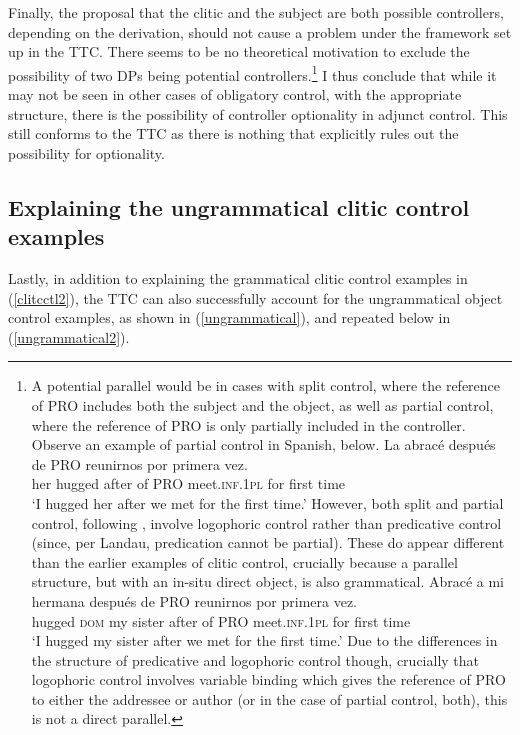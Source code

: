 \documentclass[output=paper,colorlinks,citecolor=brown]{langscibook}
\begin{document}
Finally, the proposal that the clitic and the subject are both possible controllers, depending on the derivation, should not cause a problem under the framework set up in the TTC. There seems to be no theoretical motivation to exclude the possibility of two DPs being potential controllers.\footnote{A potential parallel would be in cases with split control, where the reference of PRO includes both the subject and the object, as well as partial control, where the reference of PRO is only partially included in the controller. Observe an example of partial control in Spanish, below.
\ea
\gll La abracé después de PRO reunirnos por primera vez. \\
her hugged after of PRO meet.\textsc{inf.1pl} for first time \\
\glt ‘I hugged her after we met for the first time.’
\z
However, both split and partial control, following \citet{landau2015}, involve logophoric control rather than predicative control (since, per Landau, predication cannot be partial). These do appear different than the earlier examples of clitic control, crucially because a parallel structure, but with an in-situ direct object, is also grammatical.
\ea
\gll Abracé a mi hermana después de PRO reunirnos por primera vez. \\
hugged \textsc{dom} my sister after of PRO meet.\textsc{inf.1pl} for first time \\
\glt ‘I hugged my sister after we met for the first time.’
\z
Due to the differences in the structure of predicative and logophoric control though, crucially that logophoric control involves variable binding which gives the reference of PRO to either the addressee or author (or in the case of partial control, both), this is not a direct parallel.} I thus conclude that while it may not be seen in other cases of obligatory control, with the appropriate structure, there is the possibility of controller optionality in adjunct control. This still conforms to the TTC as there is nothing that explicitly rules out the possibility for optionality.


\subsection{Explaining the ungrammatical clitic control examples} \label{section4.3}

Lastly, in addition to explaining the grammatical clitic control examples in (\ref{clitcctl2}), the TTC can also successfully account for the ungrammatical object control examples, as shown in (\ref{ungrammatical}), and repeated below in (\ref{ungrammatical2}).
\end{document}
